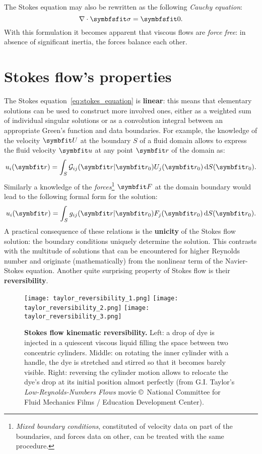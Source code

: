  The Stokes equation may also be rewritten as the following \textit{Cauchy equation}:
\begin{equation}
\nabla\cdot\symbfsfit\sigma=\symbfsfit 0.
\end{equation} 
With this formulation it becomes apparent that viscous flows are \textit{force free}: in absence of significant inertia, the forces balance each other.

\section{Stokes flow's properties}
 The Stokes equation~\eqref{eq:stokes_equation} is \textbf{linear}: this means that elementary solutions can be used to construct more involved ones, either as a weighted sum of individual singular solutions or as a convolution integral between an appropriate Green's function and data boundaries. For example, the knowledge of the velocity $\bU$ at the boundary $S$ of a fluid domain allows to express the fluid velocity $\bu$ at any point $\br$ of the domain as:
\begin{equation}
u_i(\br)=\int_S \mathcal G_{ij}(\br|\br_0)U_j(\br_0)\,\mathrm dS(\br_0).
\label{eq:stokes_green_velocity_boundary}
\end{equation}
Similarly a knowledge of the \textit{forces}\footnote{\textit{Mixed boundary conditions}, constituted of velocity data on part of the boundaries, and forces data on other, can be treated with the same procedure.} $\bF$ at the domain boundary would lead to the following formal form for the solution:
\begin{equation}
u_i(\br)=\int_S g_{ij}(\br|\br_0)F_j(\br_0)\,\mathrm dS(\br_0). 
\end{equation}
A practical consequence of these relations is the \textbf{unicity} of the Stokes flow solution: the boundary conditions uniquely determine the solution. This contrasts with the multitude of solutions that can be encountered for higher Reynolds number and originate (mathematically) from the nonlinear term of the Navier-Stokes equation.
 Another quite surprising property of Stokes flow is their \textbf{reversibility}. 
\begin{figure}[htbp]
\begin{center}
\texttt{[image: taylor\_reversibility\_1.png]}
\texttt{[image: taylor\_reversibility\_2.png]}
\texttt{[image: taylor\_reversibility\_3.png]}
\caption{\textbf{Stokes flow kinematic reversibility.} Left: a drop of dye is injected in a quiescent viscous liquid filling the space between two concentric cylinders. Middle: on rotating the inner cylinder with a handle, the dye is stretched and stirred so that it becomes barely visible. Right: reversing the cylinder motion allows to relocate the dye's drop at its initial position almost perfectly (from G.I. Taylor's \textit{Low-Reynolds-Numbers Flows} movie \copyright\ National Committee for Fluid Mechanics Films / Education Development Center).}
\label{fig:reversibility}
\end{center}
\end{figure}
